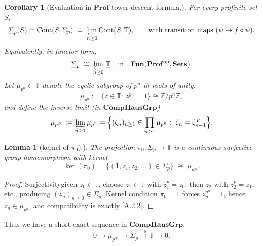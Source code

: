 \documentclass[11pt]{article}
\newtheorem{lemma}[theorem]{Lemma}
\newtheorem{corollary}[theorem]{Corollary}
\theoremstyle{remark}
\begin{document}
\begin{corollary}[Evaluation in $\mathbf{Prof}$ tower-descent formula.]
For every profinite set $S$,
\begin{equation}
\underline{\Sigma}_{p}(S)
=
\mathrm{Cont}(S,\Sigma_{p})
\;\cong\;
\varprojlim_{n\ge 0}\mathrm{Cont}(S,\mathbb T),
\qquad
\text{with transition maps }(\psi\mapsto f\circ\psi).
\label{A.1.2}
\end{equation}
Equivalently, in functor form,
\begin{equation}
\underline{\Sigma}_{p}\;\cong\;\varprojlim_{n\ge 0}\,\underline{\mathbb T}
\quad\text{in}\quad \mathbf{Fun}(\mathbf{Prof}^{\mathrm{op}},\mathbf{Sets}).
\label{A.1.3}
\end{equation} 
Let $\mu_{p^{n}}\subset\mathbb T$ denote the cyclic subgroup of $p^{n}$-th roots of unity:
\begin{equation}
\mu_{p^{n}}:=\{z\in\mathbb T:\ z^{p^{n}}=1\}\cong \mathbb Z/p^{n}\mathbb Z,
\label{A.2.1}
\end{equation}
and define the inverse limit (in $\mathbf{CompHausGrp}$)
\begin{equation}
\mu_{p^{\infty}}:=\varprojlim_{n\ge 1}\mu_{p^{n}}
=
\Bigl\{(\zeta_{n})_{n\ge 1}\in\prod_{n\ge 1}\mu_{p^{n}}:\ \zeta_{n}=\zeta_{n+1}^{\,p}\Bigr\}.
\label{A.2.2}
\end{equation}
\end{corollary}
\begin{lemma}[kernel of $\pi_{0}$).]
The projection $\pi_{0}:\Sigma_{p}\to\mathbb T$ is a continuous surjective group homomorphism with kernel
\begin{equation}
\ker(\pi_{0})
=\{(1,z_{1},z_{2},\dots)\in\Sigma_{p}\}
\;\cong\;
\mu_{p^{\infty}}.
\label{A.2.3}
\end{equation}
\end{lemma}
\begin{proof}
Surjectivity\:given $z_{0}\in\mathbb T$, choose $z_{1}\in\mathbb T$ with $z_{1}^{p}=z_{0}$, then $z_{2}$ with $z_{2}^{p}=z_{1}$, etc., producing $(z_{n})_{n\ge 0}\in\Sigma_{p}$.
Kernel condition $\pi_{0}=1$ forces $z_{n}^{p^{n}}=1$, hence $z_{n}\in\mu_{p^{n}}$, and compatibility is exactly \eqref{A.2.2}. \end{proof}

Thus we have a short exact sequence in $\mathbf{CompHausGrp}$:
\begin{equation}
0\longrightarrow \mu_{p^{\infty}}
\longrightarrow \Sigma_{p}
\overset{\pi_{0}}{\longrightarrow}\mathbb T
\longrightarrow 0.
\label{A.2.4}
\end{equation}
\end{document}
